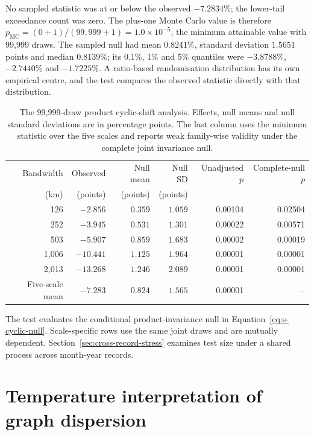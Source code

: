 \documentclass[namedate,webpdf,modern,mediumone]{oup-authoring-template}
\theoremstyle{thmstyleone}
\begin{document}
No sampled statistic was at or below the observed $-7.2834\%$; the lower-tail
exceedance count was zero. The plus-one Monte Carlo value is therefore
$p_{\mathrm{MC}}=(0+1)/(99{,}999+1)=1.0\times10^{-5}$, the minimum attainable
value with 99,999 draws. The sampled null had mean $0.8241\%$, standard deviation $1.5651$
points and median $0.8139\%$; its 0.1\%, 1\% and 5\% quantiles were
$-3.8788\%$, $-2.7440\%$ and $-1.7225\%$. A ratio-based randomisation
distribution has its own empirical centre, and the test compares the observed
statistic directly with that distribution.

\begin{table}[htbp]
\centering
\caption{The 99,999-draw product cyclic-shift analysis. Effects, null means and
null standard deviations are in percentage points. The last column uses the
minimum statistic over the five scales and reports weak family-wise validity
under the complete joint invariance null.}
\label{tab:shift-result}
\small
\setlength{\tabcolsep}{5pt}
\begin{tabular}{rrrrrr}
\toprule
Bandwidth & Observed & Null mean & Null SD & Unadjusted $p$ & Complete-null $p$ \\
(km) & (points) & (points) & (points) & & \\
\midrule
126   & $-2.856$  & $0.359$ & $1.059$ & 0.00104 & 0.02504 \\
252   & $-3.945$  & $0.531$ & $1.301$ & 0.00022 & 0.00571 \\
503   & $-5.907$  & $0.859$ & $1.683$ & 0.00002 & 0.00019 \\
1,006 & $-10.441$ & $1.125$ & $1.964$ & 0.00001 & 0.00001 \\
2,013 & $-13.268$ & $1.246$ & $2.089$ & 0.00001 & 0.00001 \\
Five-scale mean & $-7.283$ & $0.824$ & $1.565$ & 0.00001 & -- \\
\bottomrule
\end{tabular}
\end{table}

The test evaluates the conditional product-invariance null in
Equation~\eqref{eq:s-cyclic-null}. Scale-specific rows use the same joint
draws and are mutually dependent. Section~\ref{sec:cross-record-stress}
examines test size under a shared process across month-year records.

\section{Temperature interpretation of graph dispersion}
\label{sec:physical-scale}
\end{document}
